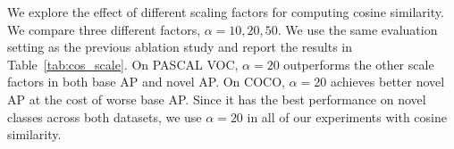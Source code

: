We explore the effect of different scaling factors for computing cosine similarity. We compare three different factors, $\alpha=10,20,50$. We use the same evaluation setting as the previous ablation study and report the results in Table~\ref{tab:cos_scale}. On PASCAL VOC, $\alpha=20$ outperforms the other scale factors in both base AP and novel AP. On COCO, $\alpha=20$ achieves better novel AP at the cost of worse base AP. Since it has the best performance on novel classes across both datasets, we use $\alpha=20$ in all of our experiments with cosine similarity.


\begin{table}[!h]
	\centering
	\footnotesize
	\setlength{\tabcolsep}{0.4em}
	\caption{Ablation of weight initialization of the novel classifier. \vspace{2mm}}
	\label{tab:weight_init} 
\end{table}


